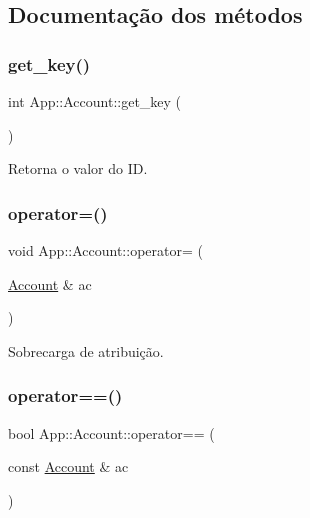 \subsection{Documentação dos métodos}
\mbox{\label{structApp_1_1Account_a9650caf273e6d33093e1270c2a7d6bab}} 
\subsubsection{\texorpdfstring{get\+\_\+key()}{get\_key()}}
{\footnotesize\ttfamily int App\+::\+Account\+::get\+\_\+key (\begin{DoxyParamCaption}{ }\end{DoxyParamCaption})\hspace{0.3cm}{\ttfamily [inline]}}



Retorna o valor do ID. 

\mbox{\label{structApp_1_1Account_a662309c8c316a9b0504b16f042444b19}} 
\subsubsection{\texorpdfstring{operator=()}{operator=()}}
{\footnotesize\ttfamily void App\+::\+Account\+::operator= (\begin{DoxyParamCaption}\item[{\hyperlink{structApp_1_1Account}{Account} \&}]{ac }\end{DoxyParamCaption})\hspace{0.3cm}{\ttfamily [inline]}}



Sobrecarga de atribuição. 

\mbox{\label{structApp_1_1Account_ab4927822154c84318aa051cc104748fa}} 
\subsubsection{\texorpdfstring{operator==()}{operator==()}}
{\footnotesize\ttfamily bool App\+::\+Account\+::operator== (\begin{DoxyParamCaption}\item[{const \hyperlink{structApp_1_1Account}{Account} \&}]{ac }\end{DoxyParamCaption})\hspace{0.3cm}{\ttfamily [inline]}}



